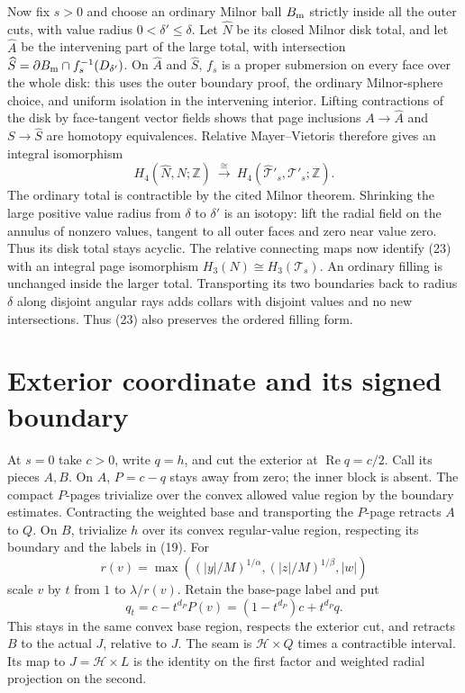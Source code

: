 \documentclass[11pt]{article}
\newcommand{\Z}{\mathbb Z}
\newcommand{\calH}{\mathcal H}
\begin{document}
Now fix \(s>0\) and choose an ordinary Milnor ball \(B_{\rm m}\)
strictly inside all the outer cuts, with value radius
\(0<\delta'\le\delta\). Let \(\widehat N\) be its closed
Milnor disk total, and let \(\widehat A\) be the intervening
part of the large total, with intersection
\(\widehat S=\partial B_{\rm m}\cap f_s^{-1}(D_{\delta'})\).
On \(\widehat A\) and \(\widehat S\), \(f_s\) is a proper
submersion on every face over the whole disk: this uses the
outer boundary proof, the ordinary Milnor-sphere choice,
and uniform isolation in the intervening interior.
Lifting contractions of the disk by face-tangent vector fields
shows that page inclusions
\(A\to\widehat A\) and \(S\to\widehat S\) are homotopy
equivalences. Relative Mayer--Vietoris therefore gives an
integral isomorphism
\[
 H_4(\widehat N,N;\Z)\ \xrightarrow{\;\cong\;}\
 H_4(\widehat{\mathcal T}'_s,\mathcal T'_s;\Z).       \tag{23}
\]
The ordinary total is contractible by the cited Milnor theorem.
Shrinking the large positive value radius from \(\delta\) to
\(\delta'\) is an isotopy: lift the radial field on the
annulus of nonzero values, tangent to all outer faces and
zero near value zero. Thus its disk total stays acyclic.
The relative connecting maps now identify (23) with an
integral page isomorphism \(H_3(N)\cong H_3(\mathcal T_s)\).
An ordinary filling is unchanged inside the larger total.
Transporting its two boundaries back to radius \(\delta\)
along disjoint angular rays adds collars with disjoint
values and no new intersections. Thus (23) also preserves
the ordered filling form.

\section{Exterior coordinate and its signed boundary}

At \(s=0\) take \(c>0\), write \(q=h\), and cut the exterior
at \(\operatorname{Re}q=c/2\). Call its pieces \(A,B\).
On \(A\), \(P=c-q\) stays away from zero; the inner block
is absent. The compact \(P\)-pages trivialize over the
convex allowed value region by the boundary estimates.
Contracting the weighted base and transporting the \(P\)-page
retracts \(A\) to \(Q\).
On \(B\), trivialize \(h\) over its convex regular-value
region, respecting its boundary and the labels in (19).
For
\[
 r(v)=\max((|y|/M)^{1/\alpha},(|z|/M)^{1/\beta},|w|)
\]
scale \(v\) by \(t\) from \(1\) to \(\lambda/r(v)\).
Retain the base-page label and put
\[
 q_t=c-t^{d_P}P(v)=(1-t^{d_P})c+t^{d_P}q.            \tag{24}
\]
This stays in the same convex base region, respects the exterior
cut, and retracts \(B\) to the actual \(J\), relative to \(J\).
The seam is \(\calH\times Q\) times a contractible interval.
Its map to \(J=\calH\times L\) is the identity on the first
factor and weighted radial projection on the second.
\end{document}
